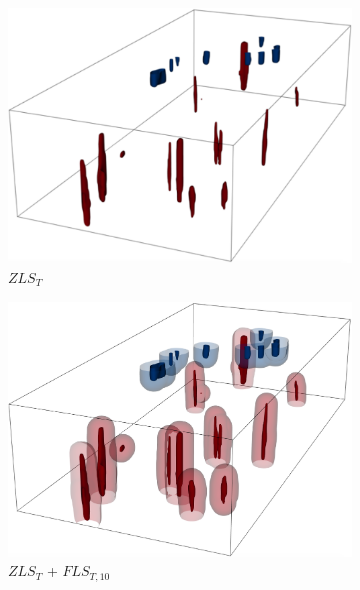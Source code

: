 \begin{figure}[!h]
\begin{subfigure}{0.23\linewidth}
\centering
\includegraphics[width=\linewidth]{Images/Mantel/zls.pdf}
\vspace{-5mm}
\caption{$ZLS_{T}$}
\label{fig:mantel_zls}
\end{subfigure}
\begin{subfigure}{0.23\linewidth}
\centering
\includegraphics[width=\linewidth]{Images/Mantel/fls_10.pdf}
\vspace{-5mm}
\caption{$ZLS_{T}$ + $FLS_{T,10}$}
\label{fig:mantel_fls}
\end{subfigure}
\begin{subfigure}{0.23\linewidth}
\centering

\end{subfigure}
\end{figure}
